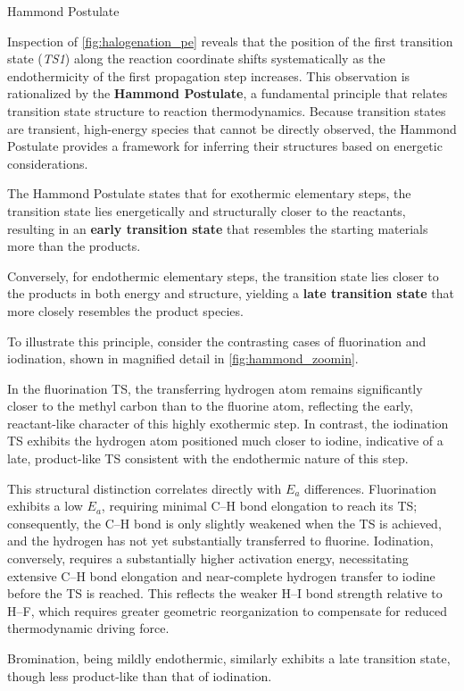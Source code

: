 \documentclass[10pt]{article}
\begin{document}
  \begin{core}[label=core:hammond_postulate]{Hammond Postulate}

    Inspection of \autoref{fig:halogenation_pe} reveals that the position of the first transition state (\textit{TS1}) along the reaction coordinate shifts systematically as the endothermicity of the first propagation step increases. This observation is rationalized by the \textbf{Hammond Postulate}, a fundamental principle that relates transition state structure to reaction thermodynamics. Because transition states are transient, high-energy species that cannot be directly observed, the Hammond Postulate provides a framework for inferring their structures based on energetic considerations.

    The Hammond Postulate states that for exothermic elementary steps, the transition state lies energetically and structurally closer to the reactants, resulting in an \textbf{early transition state} that resembles the starting materials more than the products.

    Conversely, for endothermic elementary steps, the transition state lies closer to the products in both energy and structure, yielding a \textbf{late transition state} that more closely resembles the product species.

    To illustrate this principle, consider the contrasting cases of fluorination and iodination, shown in magnified detail in \autoref{fig:hammond_zoomin}.


    In the fluorination TS, the transferring hydrogen atom remains significantly closer to the methyl carbon than to the fluorine atom, reflecting the early, reactant-like character of this highly exothermic step. In contrast, the iodination TS exhibits the hydrogen atom positioned much closer to iodine, indicative of a late, product-like TS consistent with the endothermic nature of this step.

    This structural distinction correlates directly with $E_a$ differences. Fluorination exhibits a low $E_a$, requiring minimal C--H bond elongation to reach its TS; consequently, the C--H bond is only slightly weakened when the TS is achieved, and the hydrogen has not yet substantially transferred to fluorine. Iodination, conversely, requires a substantially higher activation energy, necessitating extensive C--H bond elongation and near-complete hydrogen transfer to iodine before the TS is reached. This reflects the weaker H--I bond strength relative to H--F, which requires greater geometric reorganization to compensate for reduced thermodynamic driving force.

    Bromination, being mildly endothermic, similarly exhibits a late transition state, though less product-like than that of iodination.

  \end{core}
\end{document}
